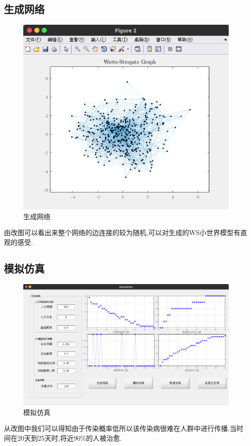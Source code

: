 \documentclass[supercite]{HustGraduPaper}
\begin{document}
	\subsection{生成网络}
	\begin{figure}[H]
		\centering
		\includegraphics[scale=0.5]{Figures/net.png}
		\caption{生成网络}
	\end{figure} 
	由改图可以看出来整个网络的边连接的较为随机,可以对生成的WS小世界模型有直观的感受.

	\subsection{模拟仿真}
	\begin{figure}[H]
		\centering
		\includegraphics[scale=0.35]{Figures/moni.png}
		\caption{模拟仿真}
	\end{figure} 
	从改图中我们可以得知由于传染概率低所以该传染病很难在人群中进行传播,当时间在20天到25天时,将近90\%的人被治愈.
\end{document}
